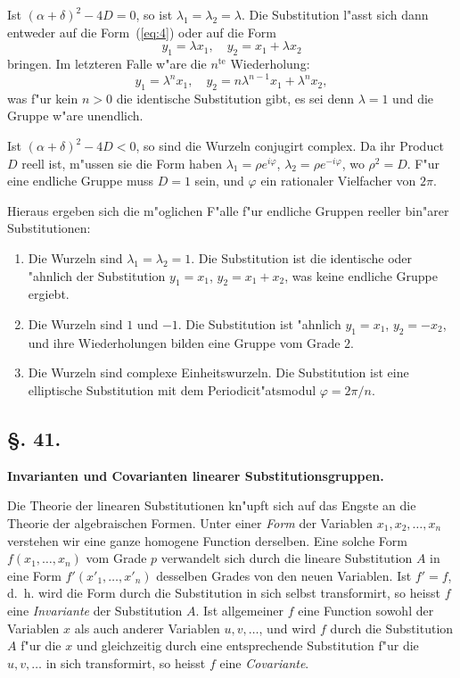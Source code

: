 \documentclass[12pt,a4paper]{article}
\theoremstyle{weber}
\begin{document}
Ist $(\alpha+\delta)^2 - 4D = 0$, so ist $\lambda_1 = \lambda_2 = \lambda$. Die Substitution l"asst sich dann entweder auf die Form~(\ref{eq:4}) oder auf die Form
\begin{equation}\label{eq:5}
y_1 = \lambda x_1,\quad y_2 = x_1 + \lambda x_2
\end{equation}
bringen. Im letzteren Falle w"are die $n^{\text{te}}$ Wiederholung:
\[
y_1 = \lambda^n x_1,\quad y_2 = n\lambda^{n-1} x_1 + \lambda^n x_2,
\]
was f"ur kein $n > 0$ die identische Substitution gibt, es sei denn $\lambda = 1$ und die Gruppe w"are unendlich.

Ist $(\alpha+\delta)^2 - 4D < 0$, so sind die Wurzeln conjugirt complex. Da ihr Product $D$ reell ist, m"ussen sie die Form haben $\lambda_1 = \rho e^{i\varphi}$, $\lambda_2 = \rho e^{-i\varphi}$, wo $\rho^2 = D$. F"ur eine endliche Gruppe muss $D = 1$ sein, und $\varphi$ ein rationaler Vielfacher von $2\pi$.

Hieraus ergeben sich die m"oglichen F"alle f"ur endliche Gruppen reeller bin"arer Substitutionen:

\begin{enumerate}[label=\arabic*.]
\item Die Wurzeln sind $\lambda_1 = \lambda_2 = 1$. Die Substitution ist die identische oder "ahnlich der Substitution $y_1 = x_1$, $y_2 = x_1 + x_2$, was keine endliche Gruppe ergiebt.
\item Die Wurzeln sind $1$ und $-1$. Die Substitution ist "ahnlich $y_1 = x_1$, $y_2 = -x_2$, und ihre Wiederholungen bilden eine Gruppe vom Grade $2$.
\item Die Wurzeln sind complexe Einheitswurzeln. Die Substitution ist eine elliptische Substitution mit dem Periodicit"atsmodul $\varphi = 2\pi/n$.
\end{enumerate}


\newpage
\subsection*{\S. 41.}

\begin{center}
\textbf{Invarianten und Covarianten linearer Substitutionsgruppen.}
\end{center}

\bigskip

Die Theorie der linearen Substitutionen kn"upft sich auf das Engste an die Theorie der algebraischen Formen. Unter einer \textit{Form} der Variablen $x_1, x_2, \ldots, x_n$ verstehen wir eine ganze homogene Function derselben. Eine solche Form $f(x_1, \ldots, x_n)$ vom Grade $p$ verwandelt sich durch die lineare Substitution $A$ in eine Form $f'(x'_1, \ldots, x'_n)$ desselben Grades von den neuen Variablen. Ist $f' = f$, d.~h. wird die Form durch die Substitution in sich selbst transformirt, so heisst $f$ eine \textit{Invariante} der Substitution $A$. Ist allgemeiner $f$ eine Function sowohl der Variablen $x$ als auch anderer Variablen $u, v, \ldots$, und wird $f$ durch die Substitution $A$ f"ur die $x$ und gleichzeitig durch eine entsprechende Substitution f"ur die $u, v, \ldots$ in sich transformirt, so heisst $f$ eine \textit{Covariante}.
\end{document}
